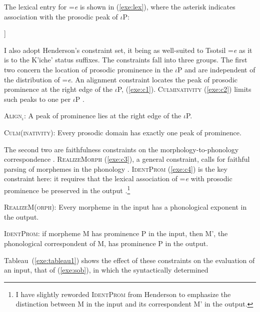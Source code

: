 \documentclass[output=paper,
modfonts
]{LSP/langsci}
\begin{document}
The lexical entry for =\emph{e} is shown in (\ref{exe:lex}), where the asterisk indicates association with
the prosodic peak of $\iota$P:
\begin{exe}
	\ex\label{exe:lex}
	\begin{forest}
		[$\ast$
			[\emph{e}]
		]
	\end{forest}
\end{exe}
I also adopt Henderson's constraint set, it being as well-suited to Tsotsil =\emph{e} as it is to the K'iche' status suffixes. 
The constraints fall into three groups. 
The first two concern the location of prosodic prominence in the $\iota$P and are independent
of the distribution of =\emph{e}. 
An alignment constraint \citep{mccarthy1993}
 locates the peak of prosodic prominence at the right edge of the $\iota$P, (\ref{exe:c1}).
\textsc{Culminativity} (\ref{exe:c2}) limits such peaks to one per $\iota$P \citep{hayes1995}.
\begin{exe}
\ex \textsc{Align$_{\iota}$}:  A peak of prominence lies at the right edge of the $\iota$P.
\label{exe:c1}
\end{exe}
\begin{exe}
\ex \textsc{Culm(inativity)}: Every prosodic domain has exactly one peak of prominence.
\label{exe:c2}
\end{exe}
The second two are faithfulness constraints on the morphology-to-phonology correspondence \citep{prince1993,mccarthy1995}.
 \textsc{RealizeMorph} (\ref{exe:c3}), a general
constraint, calls for faithful parsing of morphemes in the phonology \citep{kurisu2001}. 
\textsc{IdentProm} (\ref{exe:c4}) is the key constraint here: it requires that the lexical association of =\emph{e} with prosodic prominence be preserved in the output \citep{henderson2012ais}.\footnote
{I have slightly reworded \textsc{IdentProm} from Henderson to emphasize the distinction between M in the input
and its correspondent M' in the output.} 
\begin{exe}
\ex \textsc{RealizeM(orph)}: Every morpheme in the input has a phonological exponent in the output.
\label{exe:c3}
\end{exe}
\begin{exe}
\ex \textsc{IdentProm}: if morpheme M has prominence P in the input, then M', the phonological correspondent of M, 
has prominence P in the output.
\label{exe:c4}
\end{exe}
Tableau~(\ref{exe:tableau1}) shows the effect of these constraints on the evaluation of an input, that of (\ref{exe:sob}), in which the syntactically determined
\end{document}
